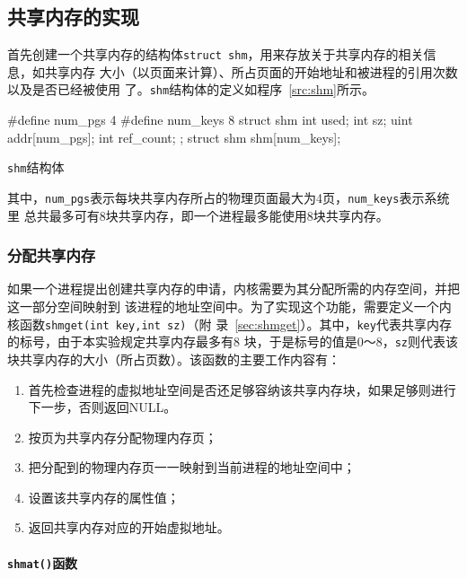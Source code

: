 \documentclass{swfuthesism}
\begin{document}
\subsection{共享内存的实现}

首先创建一个共享内存的结构体\texttt{struct shm}，用来存放关于共享内存的相关信息，如共享内存
大小（以页面来计算）、所占页面的开始地址和被进程的引用次数以及是否已经被使用
了。\texttt{shm}结构体的定义如程序~\ref{src:shm}所示。

\begin{listing}
\begin{codeblock}
\begin{ccode}
#define num_pgs 4
#define num_keys 8
struct shm{
  int used;
  int sz;
  uint addr[num_pgs];
  int ref_count;
};
struct shm shm[num_keys];
\end{ccode}
\end{codeblock}
\caption{\texttt{shm}结构体}\label{src:shm}
\end{listing}

其中，\texttt{num\_pgs}表示每块共享内存所占的物理页面最大为4页，\texttt{num\_keys}表示系统里
总共最多可有8块共享内存，即一个进程最多能使用8块共享内存。

\subsubsection{分配共享内存}

如果一个进程提出创建共享内存的申请，内核需要为其分配所需的内存空间，并把这一部分空间映射到
该进程的地址空间中。为了实现这个功能，需要定义一个内核函数\texttt{shmget(int key,int sz)}（附
录~\ref{sec:shmget}）。其中，\texttt{key}代表共享内存的标号，由于本实验规定共享内存最多有8
块，于是标号的值是0～8，\texttt{sz}则代表该块共享内存的大小（所占页数）。该函数的主要工作内容有：
\begin{enumerate}
\item 首先检查进程的虚拟地址空间是否还足够容纳该共享内存块，如果足够则进行下一步，否则返回NULL。
\item 按页为共享内存分配物理内存页；
\item 把分配到的物理内存页一一映射到当前进程的地址空间中；
\item 设置该共享内存的属性值；
\item 返回共享内存对应的开始虚拟地址。
\end{enumerate}

\paragraph{\texttt{shmat()}函数}
\end{document}
